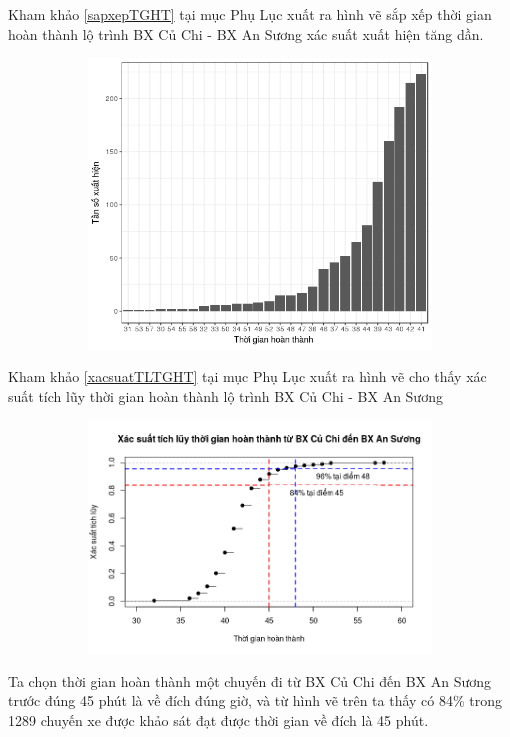 \documentclass[a4paper, 13pt]{report}
\begin{document}
\FloatBarrier
Kham khảo \ref{sapxepTGHT} tại mục Phụ Lục xuất ra hình vẽ sắp xếp thời gian hoàn thành lộ trình BX Củ Chi - BX An Sương xác suất xuất hiện tăng dần.\\
\FloatBarrier
\begin{figure}[h!]
        \begin{subfigure}[b]{0.7\textwidth}
        		\label{tab:example2}
                \includegraphics[width=\linewidth]{finishTime_CC_AS_Order}
        \end{subfigure}%
\end{figure}
\FloatBarrier
Kham khảo \ref{xacsuatTLTGHT} tại mục Phụ Lục xuất ra hình vẽ cho thấy xác suất tích lũy thời gian hoàn thành lộ trình BX Củ Chi - BX An Sương \\
\FloatBarrier
\begin{figure}[h!]
        \begin{subfigure}[b]{0.7\textwidth}
        		\label{tab:example2}
                \includegraphics[width=\linewidth]{finishTime_CC_AS_ACC_Line}
        \end{subfigure}%
\end{figure}
\FloatBarrier
Ta chọn thời gian hoàn thành một chuyến đi từ BX Củ Chi đến BX An Sương trước đúng 45 phút là về đích đúng giờ, và từ hình vẽ trên ta thấy có 84\% trong 1289 chuyến xe được khảo sát đạt được thời gian về đích là 45 phút. 
\end{document}
